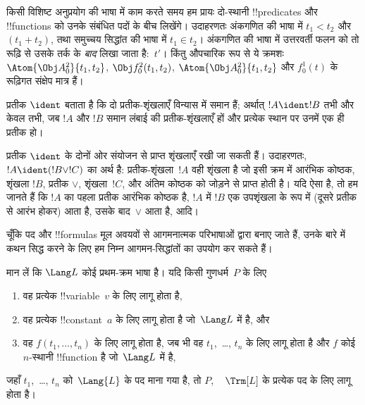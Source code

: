 \documentclass[../../../include/open-logic-section]{subfiles}
\begin{document}
किसी विशिष्ट अनुप्रयोग की भाषा में काम करते समय हम प्रायः दो-स्थानी
!!{predicate}s और !!{function}s को उनके संबंधित पदों के बीच लिखेंगे।
उदाहरणतः अंकगणित की भाषा में $t_1 < t_2$ और $(t_1 + t_2)$, तथा समुच्चय
सिद्धांत की भाषा में $t_1 \in t_2$। अंकगणित की भाषा में उत्तरवर्ती फलन को तो
रूढ़ि से उसके तर्क के \emph{बाद} लिखा जाता है:~$t'$। किंतु औपचारिक रूप से ये
क्रमशः $\Atom{\Obj A^2_0}{t_1, t_2}$, $\Obj f^2_0(t_1, t_2)$,
$\Atom{\Obj A^2_0}{t_1, t_2}$ और $f^1_0(t)$ के रूढ़िगत संक्षेप मात्र हैं।

\begin{defn}[वाक्यविन्यासगत समानता]
प्रतीक $\ident$ बताता है कि दो प्रतीक-शृंखलाएँ विन्यास में समान हैं;
अर्थात् $!A \ident !B$ तभी और केवल तभी, जब $!A$ और $!B$ समान लंबाई की
प्रतीक-शृंखलाएँ हों और प्रत्येक स्थान पर उनमें एक ही प्रतीक हो।
\end{defn}

प्रतीक $\ident$ के दोनों ओर संयोजन से प्राप्त शृंखलाएँ रखी जा सकती हैं।
उदाहरणतः, $!A \ident (!B \lor !C)$ का अर्थ है: प्रतीक-शृंखला~$!A$ वही
शृंखला है जो इसी क्रम में आरंभिक कोष्ठक, शृंखला $!B$, प्रतीक $\lor$,
शृंखला~$!C$, और अंतिम कोष्ठक को जोड़ने से प्राप्त होती है। यदि ऐसा है, तो
हम जानते हैं कि $!A$ का पहला प्रतीक आरंभिक कोष्ठक है, $!A$ में $!B$ एक
उपशृंखला के रूप में (दूसरे प्रतीक से आरंभ होकर) आता है, उसके बाद~$\lor$
आता है, आदि।

चूँकि पद और !!{formula}s मूल अवयवों से आगमनात्मक परिभाषाओं द्वारा बनाए जाते
हैं, उनके बारे में कथन सिद्ध करने के लिए हम निम्न आगमन-सिद्धांतों का उपयोग कर
सकते हैं।

\begin{lem}
    मान लें कि $\Lang L$ कोई प्रथम-क्रम भाषा है। यदि किसी गुणधर्म~$P$ के लिए
    \begin{enumerate}
        \item वह प्रत्येक !!{variable}~$v$ के लिए लागू होता है,
        \item वह प्रत्येक !!{constant}~$a$ के लिए लागू होता है जो~$\Lang L$ में है, और
        \item वह $f(t_1,\dotsc,t_n)$ के लिए लागू होता है, जब भी वह
        $t_1$,~\dots, $t_n$ के लिए लागू होता है और $f$ कोई $n$-स्थानी
            !!{function} है जो~$\Lang L$ में है,
    \end{enumerate}
    जहाँ $t_1$,~\dots, $t_n$ को~$\Lang{L}$ के पद माना गया है, तो $P$,
    ~ $\Trm[L]$ के प्रत्येक पद के लिए लागू होता है।
\end{lem}
\end{document}
